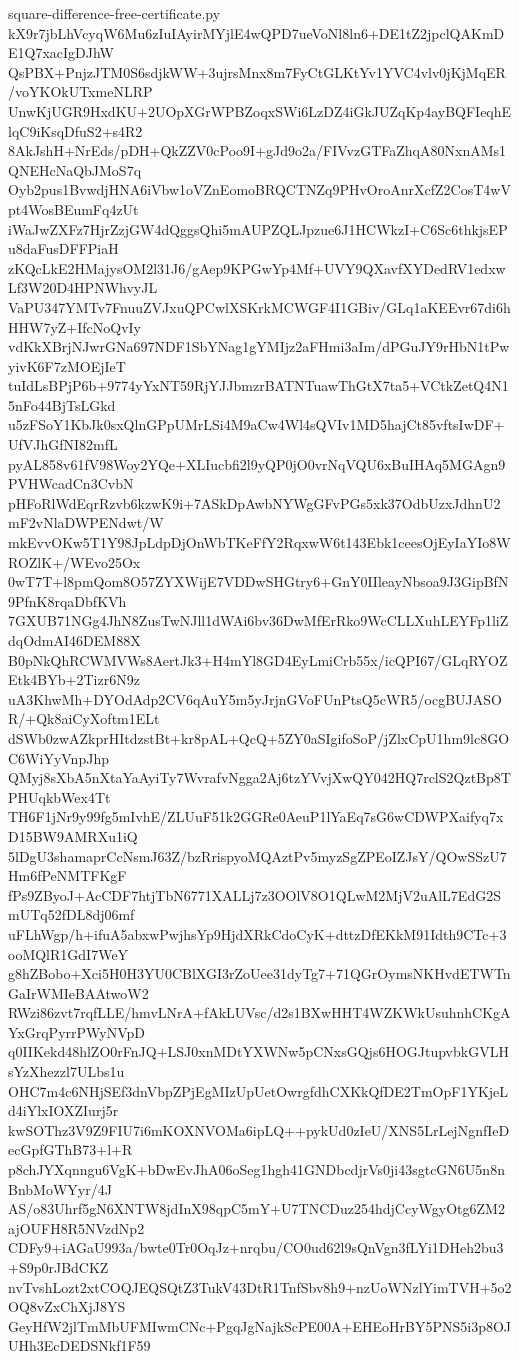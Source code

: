 \documentclass[11pt]{article}
\theoremstyle{definition}
\theoremstyle{remark}
\begin{document}
\begin{filecontents*}[overwrite]{square-difference-free-certificate.py}
kX9r7jbLhVcyqW6Mu6zIuIAyirMYjlE4wQPD7ueVoNl8ln6+DE1tZ2jpclQAKmDE1Q7xacIgDJhW
QsPBX+PnjzJTM0S6sdjkWW+3ujrsMnx8m7FyCtGLKtYv1YVC4vlv0jKjMqER/voYKOkUTxmeNLRP
UnwKjUGR9HxdKU+2UOpXGrWPBZoqxSWi6LzDZ4iGkJUZqKp4ayBQFIeqhElqC9iKsqDfuS2+s4R2
8AkJshH+NrEds/pDH+QkZZV0cPoo9I+gJd9o2a/FIVvzGTFaZhqA80NxnAMs1QNEHcNaQbJMoS7q
Oyb2pus1BvwdjHNA6iVbw1oVZnEomoBRQCTNZq9PHvOroAnrXcfZ2CosT4wVpt4WosBEumFq4zUt
iWaJwZXFz7HjrZzjGW4dQggsQhi5mAUPZQLJpzue6J1HCWkzI+C6Sc6thkjsEPu8daFusDFFPiaH
zKQcLkE2HMajysOM2l31J6/gAep9KPGwYp4Mf+UVY9QXavfXYDedRV1edxwLf3W20D4HPNWhvyJL
VaPU347YMTv7FnuuZVJxuQPCwlXSKrkMCWGF4I1GBiv/GLq1aKEEvr67di6hHHW7yZ+IfcNoQvIy
vdKkXBrjNJwrGNa697NDF1SbYNag1gYMIjz2aFHmi3aIm/dPGuJY9rHbN1tPwyivK6F7zMOEjIeT
tuIdLsBPjP6b+9774yYxNT59RjYJJbmzrBATNTuawThGtX7ta5+VCtkZetQ4N15nFo44BjTsLGkd
u5zFSoY1KbJk0sxQlnGPpUMrLSi4M9aCw4Wl4sQVIv1MD5hajCt85vftsIwDF+UfVJhGfNI82mfL
pyAL858v61fV98Woy2YQe+XLIucbfi2l9yQP0jO0vrNqVQU6xBuIHAq5MGAgn9PVHWcadCn3CvbN
pHFoRlWdEqrRzvb6kzwK9i+7ASkDpAwbNYWgGFvPGs5xk37OdbUzxJdhnU2mF2vNlaDWPENdwt/W
mkEvvOKw5T1Y98JpLdpDjOnWbTKeFfY2RqxwW6t143Ebk1ceesOjEyIaYIo8WROZlK+/WEvo25Ox
0wT7T+l8pmQom8O57ZYXWijE7VDDwSHGtry6+GnY0IIleayNbsoa9J3GipBfN9PfnK8rqaDbfKVh
7GXUB71NGg4JhN8ZusTwNJll1dWAi6bv36DwMfErRko9WcCLLXuhLEYFp1liZdqOdmAI46DEM88X
B0pNkQhRCWMVWs8AertJk3+H4mYl8GD4EyLmiCrb55x/icQPI67/GLqRYOZEtk4BYb+2Tizr6N9z
uA3KhwMh+DYOdAdp2CV6qAuY5m5yJrjnGVoFUnPtsQ5cWR5/ocgBUJASOR/+Qk8aiCyXoftm1ELt
dSWb0zwAZkprHItdzstBt+kr8pAL+QcQ+5ZY0aSIgifoSoP/jZlxCpU1hm9lc8GOC6WiYyVnpJhp
QMyj8sXbA5nXtaYaAyiTy7WvrafvNgga2Aj6tzYVvjXwQY042HQ7rclS2QztBp8TPHUqkbWex4Tt
TH6F1jNr9y99fg5mIvhE/ZLUuF51k2GGRe0AeuP1lYaEq7sG6wCDWPXaifyq7xD15BW9AMRXu1iQ
5lDgU3shamaprCcNsmJ63Z/bzRrispyoMQAztPv5myzSgZPEoIZJsY/QOwSSzU7Hm6fPeNMTFKgF
fPs9ZByoJ+AcCDF7htjTbN6771XALLj7z3OOlV8O1QLwM2MjV2uAlL7EdG2SmUTq52fDL8dj06mf
uFLhWgp/h+ifuA5abxwPwjhsYp9HjdXRkCdoCyK+dttzDfEKkM91Idth9CTc+3ooMQlR1GdI7WeY
g8hZBobo+Xci5H0H3YU0CBlXGI3rZoUee31dyTg7+71QGrOymsNKHvdETWTnGaIrWMIeBAAtwoW2
RWzi86zvt7rqfLLE/hmvLNrA+fAkLUVsc/d2s1BXwHHT4WZKWkUsuhnhCKgAYxGrqPyrrPWyNVpD
q0IIKekd48hlZO0rFnJQ+LSJ0xnMDtYXWNw5pCNxsGQjs6HOGJtupvbkGVLHsYzXhezzl7ULbs1u
OHC7m4c6NHjSEf3dnVbpZPjEgMIzUpUetOwrgfdhCXKkQfDE2TmOpF1YKjeLd4iYlxIOXZIurj5r
kwSOThz3V9Z9FIU7i6mKOXNVOMa6ipLQ++pykUd0zIeU/XNS5LrLejNgnfIeDecGpfGThB73+l+R
p8chJYXqnngu6VgK+bDwEvJhA06oSeg1hgh41GNDbcdjrVs0ji43sgtcGN6U5n8nBnbMoWYyr/4J
AS/o83Uhrf5gN6XNTW8jdInX98qpC5mY+U7TNCDuz254hdjCcyWgyOtg6ZM2ajOUFH8R5NVzdNp2
CDFy9+iAGaU993a/bwte0Tr0OqJz+nrqbu/CO0ud62l9sQnVgn3fLYi1DHeh2bu3+S9p0rJBdCKZ
nvTvshLozt2xtCOQJEQSQtZ3TukV43DtR1TnfSbv8h9+nzUoWNzlYimTVH+5o2OQ8vZxChXjJ8YS
GeyHfW2jlTmMbUFMIwmCNc+PgqJgNajkScPE00A+EHEoHrBY5PNS5i3p8OJUHh3EcDEDSNkf1F59

\end{filecontents*}
\end{document}
